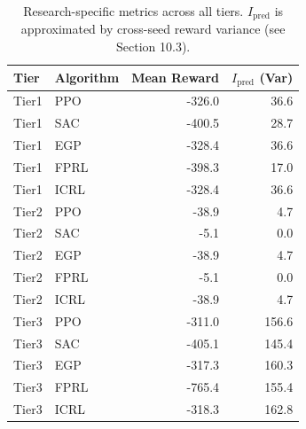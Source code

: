 \begin{table}[h]
\centering
\caption{Research-specific metrics across all tiers. $I_{\text{pred}}$ is approximated by cross-seed reward variance (see Section 10.3).}
\label{tab:metrics}
\begin{tabular}{ll rr}
\toprule
Tier & Algorithm & Mean Reward & $I_{\text{pred}}$ (Var) \\
\midrule
Tier1 & PPO & -326.0 & 36.6 \\
Tier1 & SAC & -400.5 & 28.7 \\
Tier1 & EGP & -328.4 & 36.6 \\
Tier1 & FPRL & -398.3 & 17.0 \\
Tier1 & ICRL & -328.4 & 36.6 \\
\midrule
Tier2 & PPO & -38.9 & 4.7 \\
Tier2 & SAC & -5.1 & 0.0 \\
Tier2 & EGP & -38.9 & 4.7 \\
Tier2 & FPRL & -5.1 & 0.0 \\
Tier2 & ICRL & -38.9 & 4.7 \\
\midrule
Tier3 & PPO & -311.0 & 156.6 \\
Tier3 & SAC & -405.1 & 145.4 \\
Tier3 & EGP & -317.3 & 160.3 \\
Tier3 & FPRL & -765.4 & 155.4 \\
Tier3 & ICRL & -318.3 & 162.8 \\
\bottomrule
\end{tabular}
\end{table}
